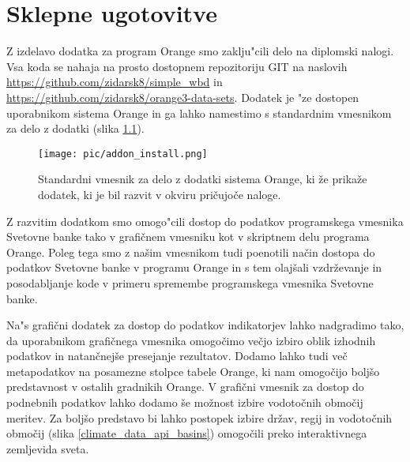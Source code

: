 \chapter{Sklepne ugotovitve}



Z izdelavo dodatka za program Orange smo zaklju"cili delo na diplomski nalogi.
Vsa koda se nahaja na prosto dostopnem repozitoriju GIT na naslovih
\url{https://github.com/zidarsk8/simple_wbd} in
\url{https://github.com/zidarsk8/orange3-data-sets}.
Dodatek je "ze dostopen uporabnikom sistema Orange in ga lahko namestimo s
standardnim vmesnikom za delo z dodatki (slika \ref{addon_install}).



\begin{figure}
\begin{center}
\texttt{[image: pic/addon\_install.png]}
\end{center}
\caption{Standardni vmesnik za delo z dodatki sistema Orange, ki že prikaže 
dodatek, ki je bil razvit v okviru pričujoče naloge.}
\label{addon_install}
\end{figure} 




Z razvitim dodatkom smo omogo"cili dostop do podatkov programskega vmesnika Svetovne 
banke tako v grafičnem vmesniku kot v skriptnem delu programa Orange. Poleg tega
smo z našim vmesnikom tudi poenotili način dostopa do podatkov Svetovne banke
v programu Orange in s tem olajšali vzdrževanje in posodabljanje kode v
primeru spremembe programskega vmesnika Svetovne banke.



Na"s grafični dodatek za dostop do podatkov indikatorjev lahko nadgradimo tako,
da uporabnikom grafičnega vmesnika omogočimo večjo izbiro oblik izhodnih
podatkov in natančnejše presejanje rezultatov. Dodamo lahko tudi več
metapodatkov na posamezne stolpce tabele Orange, ki nam omogočijo boljšo
predstavnost v ostalih gradnikih Orange. V grafični vmesnik za dostop do
podnebnih podatkov lahko dodamo še možnost izbire vodotočnih območij meritev.
Za boljšo predstavo bi lahko postopek izbire držav, regij in vodotočnih
območij (slika \ref{climate_data_api_basins}) omogočili preko interaktivnega 
zemljevida sveta.

% 
% 
